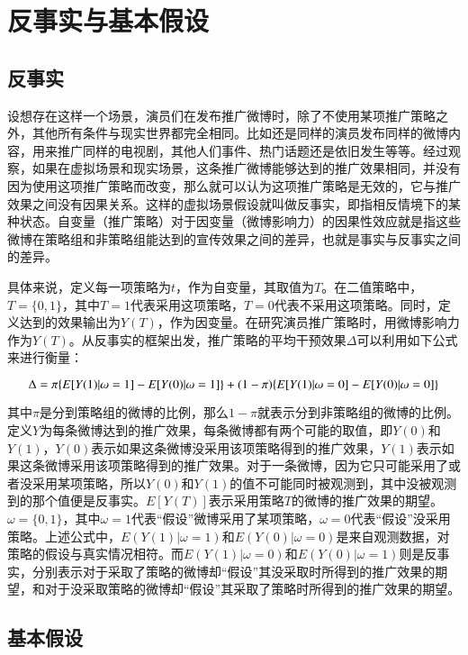 \section{反事实与基本假设}
\subsection{反事实}
设想存在这样一个场景，演员们在发布推广微博时，除了不使用某项推广策略之外，其他所有条件与现实世界都完全相同。比如还是同样的演员发布同样的微博内容，用来推广同样的电视剧，其他人们事件、热门话题还是依旧发生等等。经过观察，如果在虚拟场景和现实场景，这条推广微博能够达到的推广效果相同，并没有因为使用这项推广策略而改变，那么就可以认为这项推广策略是无效的，它与推广效果之间没有因果关系。这样的虚拟场景假设就叫做反事实，即指相反情境下的某种状态\cite{胡安宁2012倾向值匹配与因果推论}。自变量（推广策略）对于因变量（微博影响力）的因果性效应就是指这些微博在策略组和非策略组能达到的宣传效果之间的差异，也就是事实与反事实之间的差异。

具体来说，定义每一项策略为$t$，作为自变量，其取值为$T$。在二值策略中，$T=\{0,1\}$，其中$T=1$代表采用这项策略，$T=0$代表不采用这项策略。同时，定义达到的效果输出为$Y(T)$，作为因变量。在研究演员推广策略时，用微博影响力作为$Y(T)$。从反事实的框架出发，推广策略的平均干预效果$\Delta$可以利用如下公式来进行衡量：

\begin{equation}
\Delta =\pi\{E[Y(1)|\omega=1]-E[Y(0)|\omega=1]\}+(1-\pi)\{E[Y(1)|\omega=0]-E[Y(0)|\omega=0]\}\\
\label{equ}
\end{equation}

其中$\pi$是分到策略组的微博的比例，那么$1-\pi$就表示分到非策略组的微博的比例。定义$Y$为每条微博达到的推广效果，每条微博都有两个可能的取值，即$Y(0)$和$Y(1)$，$Y(0)$表示如果这条微博没采用该项策略得到的推广效果，$Y(1)$表示如果这条微博采用该项策略得到的推广效果。对于一条微博，因为它只可能采用了或者没采用某项策略，所以$Y(0)$和$Y(1)$的值不可能同时被观测到，其中没被观测到的那个值便是反事实。$E[Y(T)]$表示采用策略$T$的微博的推广效果的期望。$\omega=\{0,1\}$，其中$\omega=1$代表“假设”微博采用了某项策略，$\omega=0$代表“假设”没采用策略。上述公式中，$E(Y(1)|\omega=1)$和$E(Y(0)|\omega=0)$是来自观测数据，对策略的假设与真实情况相符。而$E(Y(1)|\omega=0)$和$E(Y(0)|\omega=1)$则是反事实，分别表示对于采取了策略的微博却“假设”其没采取时所得到的推广效果的期望，和对于没采取策略的微博却“假设”其采取了策略时所得到的推广效果的期望。

\subsection{基本假设}


